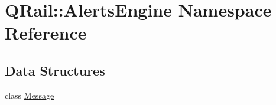 \hypertarget{namespaceQRail_1_1AlertsEngine}{}\section{Q\+Rail\+::Alerts\+Engine Namespace Reference}
\label{namespaceQRail_1_1AlertsEngine}
\subsection*{Data Structures}
\begin{DoxyCompactItemize}
\item 
class \mbox{\hyperlink{classQRail_1_1AlertsEngine_1_1Message}{Message}}
\end{DoxyCompactItemize}
